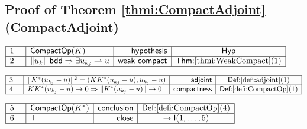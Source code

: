 \documentclass[11pt,reqno]{amsart}
\begin{document}
	\subsection*{Proof of Theorem \protect\ref{thmi:CompactAdjoint} (\textsf{CompactAdjoint})}
	\noindent$\begin{array}{|m{0.5cm}|l|r|c|}
	\hline
	1 & \mathsf{CompactOp}(K) & \mathsf{hypothesis} & \mathsf{Hyp} \\ \hline
	2 & \|u_{k}\|\;\mathsf{bdd}\Rightarrow\exists u_{k_{j}}\rightharpoonup u & \mathsf{weak\ compact} & \textsf{Thm:}\ref{thmi:WeakCompact}(1) \\ \hline
	\end{array}$
	\par\nointerlineskip\noindent$\begin{array}{|m{0.5cm}|l|r|c|}
	\hline
	3 & \|K^{*}(u_{k_{j}}-u)\|^{2}=(KK^{*}(u_{k_{j}}-u),u_{k_{j}}-u) & \mathsf{adjoint} & \textsf{Def:}\ref{defi:adjoint}(1) \\ \hline
	4 & KK^{*}(u_{k_{j}}-u)\to0\Rightarrow\|K^{*}(u_{k_{j}}-u)\|\to0 & \mathsf{compactness} & \textsf{Def:}\ref{defi:CompactOp}(1) \\ \hline
	\end{array}$
	\par\nointerlineskip\noindent$\begin{array}{|m{0.5cm}|l|r|c|}
	\hline
	5 & \mathsf{CompactOp}(K^{*}) & \mathsf{conclusion} & \textsf{Def:}\ref{defi:CompactOp}(4) \\ \hline
	6 & \top & \mathsf{close} & \to\mathsf{I}(1,\dots,5) \\ \hline
	\end{array}$
	\medskip
	
\end{document}
